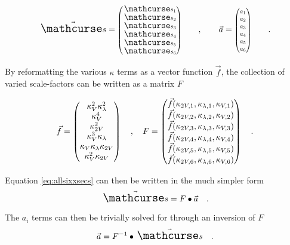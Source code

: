     \begin{equation}
        \vec{\xsec} = \minimatrix{ \xsec_{1} \\ \xsec_{2} \\ \xsec_{3} \\ \xsec_{4} \\ \xsec_{5} \\ \xsec_{6} }
        \qquad,\qquad
        \vec{a} = \minimatrix{ a_1 \\ a_2 \\ a_3 \\ a_4 \\ a_5 \\ a_6 }
        \qquad.
    \end{equation}

    By reformatting the various $\kappa$ terms as a vector function $\vec{f}$,
        the collection of varied scale-factors can be written as a matrix $F$

    \begin{equation}
        \vec{f} = \begin{pmatrix} \kappa_{V}^2 \kappa_{\lambda}^2 \\ \kappa_{V}^4 \\ \kappa_{2V}^2 \\ \kappa_{V}^3 \kappa_{\lambda} \\ \kappa_{V} \kappa_{\lambda} \kappa_{2V} \\ \kappa_{V}^2 \kappa_{2V} \end{pmatrix}
        \quad,\quad
        F = \begin{pmatrix}
            \vec{f}(\kappa_{2V,1}, \kappa_{\lambda,1}, \kappa_{V,1}) \\
            \vec{f}(\kappa_{2V,2}, \kappa_{\lambda,2}, \kappa_{V,2}) \\
            \vec{f}(\kappa_{2V,3}, \kappa_{\lambda,3}, \kappa_{V,3}) \\
            \vec{f}(\kappa_{2V,4}, \kappa_{\lambda,4}, \kappa_{V,4}) \\
            \vec{f}(\kappa_{2V,5}, \kappa_{\lambda,5}, \kappa_{V,5}) \\
            \vec{f}(\kappa_{2V,6}, \kappa_{\lambda,6}, \kappa_{V,6}) \\
        \end{pmatrix}
        \quad.
    \end{equation}

    Equation \ref{eq:allsixxsecs} can then be written in the much simpler form
    \begin{equation}
        \vec{\xsec} = F \bullet \vec{a}
        \quad.
    \end{equation}

    The $a_i$ terms can then be trivially solved for through an inversion of $F$
    \begin{equation} \label{eq:amp_solution}
        \vec{a} = F^{-1} \bullet \vec{\xsec}
        \quad.
    \end{equation}

